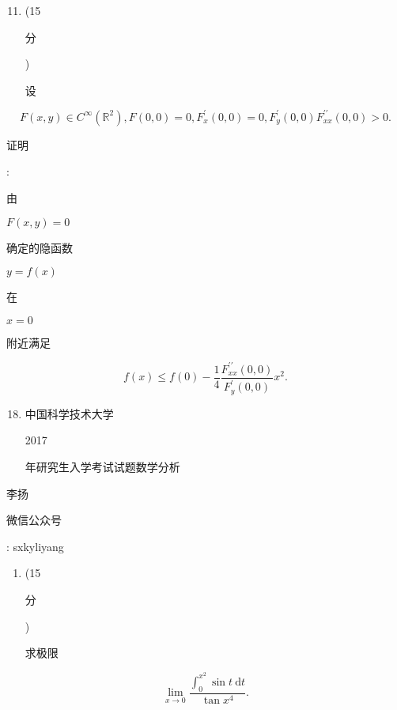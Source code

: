 \documentclass[10pt]{article}
\begin{document}
\begin{enumerate}
  \setcounter{enumi}{10}
  \item (15 \begin{CJK}{UTF8}{mj}分\end{CJK}) \begin{CJK}{UTF8}{mj}设\end{CJK}
\end{enumerate}
$$
F(x, y) \in C^{\infty}\left(\mathbb{R}^{2}\right), F(0,0)=0, F_{x}^{\prime}(0,0)=0, F_{y}^{\prime}(0,0) F_{x x}^{\prime \prime}(0,0)>0 .
$$
\begin{CJK}{UTF8}{mj}证明\end{CJK}: \begin{CJK}{UTF8}{mj}由\end{CJK} $F(x, y)=0$ \begin{CJK}{UTF8}{mj}确定的隐函数\end{CJK} $y=f(x)$ \begin{CJK}{UTF8}{mj}在\end{CJK} $x=0$ \begin{CJK}{UTF8}{mj}附近满足\end{CJK}
$$
f(x) \leqslant f(0)-\frac{1}{4} \frac{F_{x x}^{\prime \prime}(0,0)}{F_{y}^{\prime}(0,0)} x^{2} .
$$

\begin{enumerate}
  \setcounter{enumi}{17}
  \item \begin{CJK}{UTF8}{mj}中国科学技术大学\end{CJK} 2017 \begin{CJK}{UTF8}{mj}年研究生入学考试试题数学分析\end{CJK}
\end{enumerate}
\begin{CJK}{UTF8}{mj}李扬\end{CJK}

\begin{CJK}{UTF8}{mj}微信公众号\end{CJK}: sxkyliyang

\begin{enumerate}
  \item (15 \begin{CJK}{UTF8}{mj}分\end{CJK}) \begin{CJK}{UTF8}{mj}求极限\end{CJK}
\end{enumerate}
$$
\lim _{x \rightarrow 0} \frac{\int_{0}^{x^{2}} \sin t \mathrm{~d} t}{\tan x^{4}} .
$$
\end{document}
